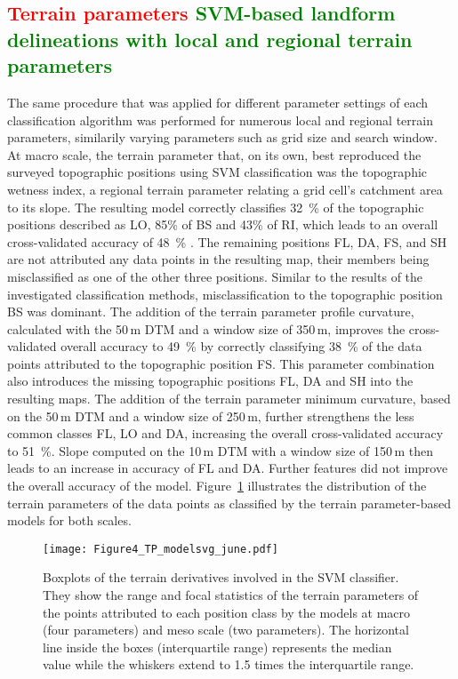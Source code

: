 \documentclass[preprint,12pt,authoryear]{elsarticle}
\begin{document}
\subsection{\textcolor{red}{Terrain parameters} \textcolor{green}{SVM-based landform delineations with local and regional terrain parameters}}
The same procedure that was applied for different parameter settings of each classification algorithm was performed for  numerous local and regional terrain parameters, similarily varying parameters such as grid size and search window. At macro scale, the terrain parameter that, on its own, best reproduced the surveyed topographic positions using SVM classification was the topographic wetness index, a regional terrain parameter relating a grid cell's catchment area to its slope. The resulting model correctly classifies 32~\% of the topographic positions described as LO, 85\% of BS and 43\% of RI, which leads to an overall cross-validated accuracy of 48~\% . The remaining positions FL, DA, FS, and SH are not attributed any data points in the resulting map, their members being misclassified as one of the other three positions. Similar to the results of the investigated classification methods, misclassification to the topographic position BS was dominant. The addition of the terrain parameter profile curvature, calculated with the 50\,m DTM and a window size of 350\,m, improves the cross-validated overall accuracy to 49~\% by correctly classifying 38~\% of the data points attributed to the topographic position FS. This parameter combination also introduces the missing topographic positions FL, DA and SH into the resulting maps. The addition of the terrain parameter minimum curvature, based on the 50\,m DTM and a window size of 250\,m, further strengthens the less common classes FL, LO and DA, increasing the overall cross-validated accuracy to 51~\%. Slope computed on the 10\,m DTM with a window size of 150\,m then leads to an increase in accuracy of FL and DA. Further features did not improve the overall accuracy of the model. Figure~\ref{fig:tp_model} illustrates the distribution of the terrain parameters of the data points as classified by the terrain parameter-based models for both scales.

\begin{figure}
\texttt{[image: Figure4\_TP\_modelsvg\_june.pdf]}
\caption{Boxplots of the terrain derivatives involved in the SVM classifier. They show the range and focal statistics of the terrain parameters of the points attributed to each position class by the models at macro (four parameters) and meso scale (two parameters). The horizontal line inside the boxes (interquartile range) represents the median value while the whiskers extend to 1.5 times the interquartile range.}
\label{fig:tp_model}
\end{figure}
\end{document}
